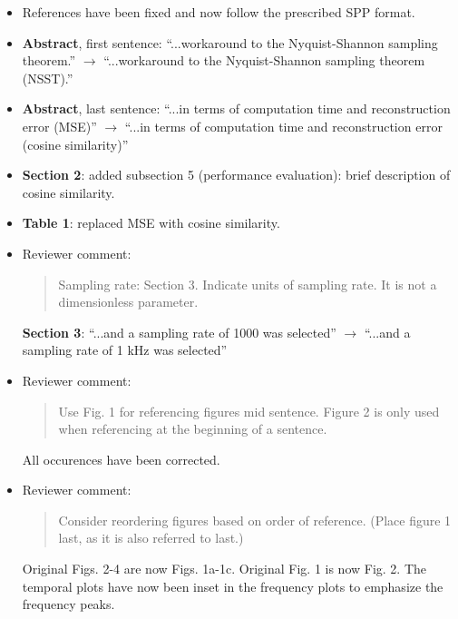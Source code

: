 \documentclass[10pt,a4paper,twoside]{article}
\begin{document}
\begin{itemize}

\item References have been fixed and now follow the prescribed SPP format.

\item \textbf{Abstract}, first sentence: ``...workaround to the Nyquist-Shannon sampling theorem.'' $\rightarrow$ ``...workaround to the Nyquist-Shannon sampling theorem (NSST).''

\item \textbf{Abstract}, last sentence: ``...in terms of computation time and reconstruction error (MSE)'' $\rightarrow$ ``...in terms of computation time and reconstruction error (cosine similarity)''

\item \textbf{Section 2}: added subsection 5 (performance evaluation): brief description of cosine similarity.

\item \textbf{Table 1}: replaced MSE with cosine similarity.

\item Reviewer comment:

\begin{quote}
	Sampling rate: Section 3. Indicate units of sampling rate. It is not a dimensionless parameter.
\end{quote}

\textbf{Section 3}: ``...and a sampling rate of 1000 was selected'' $\rightarrow$ ``...and a sampling rate of 1 kHz was selected''

\item Reviewer comment:

\begin{quote}
	Use Fig. 1 for referencing figures mid sentence. Figure 2 is only used when referencing at the beginning of a sentence.
\end{quote}

All occurences have been corrected.

\item Reviewer comment:

\begin{quote}
	Consider reordering figures based on order of reference. (Place figure 1 last, as it is also referred to last.)
\end{quote}

Original Figs. 2-4 are now Figs. 1a-1c. Original Fig. 1 is now Fig. 2. The temporal plots have now been inset in the frequency plots to emphasize the frequency peaks.


\end{itemize}
\end{document}

